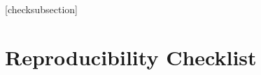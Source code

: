 \makeatletter
{}
\makeatother

\setlength{\pdfpagewidth}{8.5in}
\setlength{\pdfpageheight}{11in}
\frenchspacing

\setlength{\leftmargini}{20pt}
\makeatletter
\def\@listi{\leftmargin\leftmargini \topsep .5em \parsep .5em \itemsep .5em}
\def\@listii{\leftmargin\leftmarginii \labelwidth\leftmarginii \advance\labelwidth-\labelsep \topsep .4em \parsep .4em \itemsep .4em}
\def\@listiii{\leftmargin\leftmarginiii \labelwidth\leftmarginiii \advance\labelwidth-\labelsep \topsep .4em \parsep .4em \itemsep .4em}
\makeatother

\setcounter{secnumdepth}{0}
\renewcommand\thesubsection{\arabic{subsection}}
\renewcommand\labelenumi{\thesubsection.\arabic{enumi}}

[checksubsection]

\newcommand{\checksubsection}[1]{%
  \refstepcounter{checksubsection}%
  \paragraph{\arabic{checksubsection}. #1}%
  \setcounter{checkitem}{0}%
}

\newcommand{\checkitem}{%
  \refstepcounter{checkitem}%
  \item[\arabic{checksubsection}.\arabic{checkitem}.]%
}
\newcommand{\question}[2]{\normalcolor\checkitem #1 #2 \color{blue}}
\newcommand{\ifyespoints}[1]{\makebox[0pt][l]{\hspace{-15pt}\normalcolor #1}}

\ifreproStandalone

\fi

\section*{Reproducibility Checklist}





